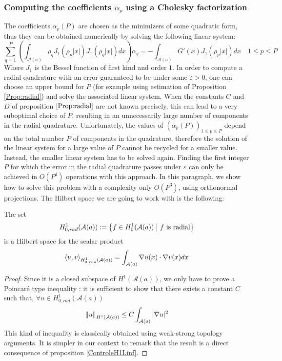 \documentclass[11pt,a4paper]{article}
\begin{document}
\subsubsection{Computing the coefficients $\alpha_p$ using a Cholesky factorization}
\label{subsub:Chol}

The coefficients $\alpha_p(P)$ are chosen as the minimizers of some quadratic form, thus they can be obtained numerically by solving the following linear system: 
\begin{equation}
\sum_{q = 1}^P \left(\int_{\mathcal{A}(a)} \rho_ q J_1(\rho_p|x|) J_1(\rho_q|x|) dx\right) \alpha_q = -\int_{\mathcal{A}(a)} G'(x) J_1(\rho_p|x|)dx \quad 1\leq p \leq P
\label{LinearSystem}
\end{equation}
Where $J_1$ is the Bessel function of first kind and order $1$. 
In order to compute a radial quadrature with an error guaranteed to be under some $\varepsilon >0$, one can choose an upper bound for $P$ (for example using estimation of Proposition \ref{Prop:radial}) and solve the associated linear system. When the constants $C$ and $D$ of proposition $\ref{Prop:radial}$ are not known precisely, this can lead to a very suboptimal choice of $P$, resulting in an unnecessarily large number of components in the radial quadrature. Unfortunately, the values of $(\alpha_p(P))_{1\leq p \leq P}$ depend on the total number $P$ of components in the quadrature, therefore the solution of the linear system for a large value of $P$ cannot be recycled for a smaller value. Instead, the smaller linear system has to be solved again. Finding the first integer $P$ for which the error in the radial quadrature passes under $\varepsilon$ can only be achieved in $O(P^4)$ operations with this approach.
In this paragraph, we show how to solve this problem with a complexity only $O(P^3)$, using orthonormal projections. The Hilbert space we are going to work with is the following:

\begin{Prop} \label{defEnAvanceH1}The set \[H^1_{0,rad}(\mathcal{A}(a)) := \left\{f \in H^1_0(\mathcal{A}(a))\mathrel{}\middle|\mathrel{}f \textup{ is radial} \right\}\]
is a Hilbert space for the scalar product 
\[\left\langle u,v\right\rangle_{H^1_{0,rad}(\mathcal{A}(a))} = \int_{\mathcal{A}(a)}\nabla u(x) \cdot \nabla v(x)dx\]
\begin{proof}
Since it is a closed subspace of $H^1(\mathcal{A}(a))$, we only have to prove a Poincaré type inequality : it is sufficient to show that there exists a constant $C$ such that, $\forall u \in H^1_{0,rad}(\mathcal{A}(a))$ 
\[ \left\|u\right\|_{H^1(\mathcal{A}(a))} \leq C\int_{\mathcal{A}(a)} |\nabla u|^2\]
This kind of inequality is classically obtained using weak-strong topology arguments. It is simpler in our context to remark that the result is a direct consequence of proposition \ref{ControleH1Linf}.
\end{proof}
\end{Prop}
\end{document}
